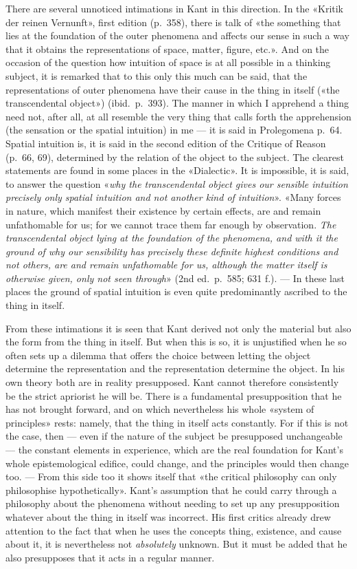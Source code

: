 \documentclass[12pt,a4paper]{article}
\newcommand{\opage}[1]{\marginnote{\footnotesize\textit{[#1]}}}
\begin{document}
There are several unnoticed intimations in Kant in this direction. In the
«Kritik der reinen Vernunft», first edition (p.\ 358), there is talk of
«the something that lies at the foundation of the outer phenomena and
affects our sense in such a way that it obtains the representations of
space, matter, figure, etc.». And on the occasion of the question how
intuition of space is at all possible in a thinking subject, it is remarked
that to this only this much can be said, that the representations of outer
phenomena have their cause in the thing in itself («the transcendental
object») (ibid.\ p.\ 393). The manner in which I apprehend a thing need
not, after all, at all resemble the very thing that calls forth the
apprehension (the sensation or the spatial intuition) in me --- it is said
in Prolegomena p.\ 64. Spatial intuition is, it is said in the second
edition of the Critique of Reason (p.\ 66, 69), determined by the relation
of the object to the subject. The clearest statements are found in some
places in the «Dialectic». It is impossible, it is said, to answer the
question «\emph{why the transcendental object gives our sensible intuition
precisely only spatial intuition and not another kind of intuition}». «Many
forces in nature, which manifest their existence by certain effects, are
and remain unfathomable for us; for we cannot trace them far enough by
observation. \emph{The transcendental object lying at the foundation of the
phenomena, and with it the ground of why our sensibility has precisely
these definite highest conditions and not others, are and remain
unfathomable for us, although the matter itself is otherwise given, only
not seen through}» (2nd ed.\ p.\ 585; 631 f.). --- In \opage{34}these last places the
ground of spatial intuition is even quite predominantly ascribed to the
thing in itself.

From these intimations it is seen that Kant derived not only the material
but also the form from the thing in itself. But when this is so, it is
unjustified when he so often sets up a dilemma that offers the choice
between letting the object determine the representation and the
representation determine the object. In his own theory both are in reality
presupposed. Kant cannot therefore consistently be the strict apriorist he
will be. There is a fundamental presupposition that he has not brought
forward, and on which nevertheless his whole «system of principles» rests:
namely, that the thing in itself acts constantly. For if this is not the
case, then --- even if the nature of the subject be presupposed
unchangeable --- the constant elements in experience, which are the real
foundation for Kant's whole epistemological edifice, could change, and the
principles would then change too. --- From this side too it shows itself
that «the critical philosophy can only philosophise hypothetically». Kant's
assumption that he could carry through a philosophy about the phenomena
without needing to set up any presupposition whatever about the thing in
itself was incorrect. His first critics already drew attention to the fact
that when he uses the concepts thing, existence, and cause about it, it is
nevertheless not \emph{absolutely} unknown. But it must be added that he also
presupposes that it acts in a regular manner.
\end{document}
